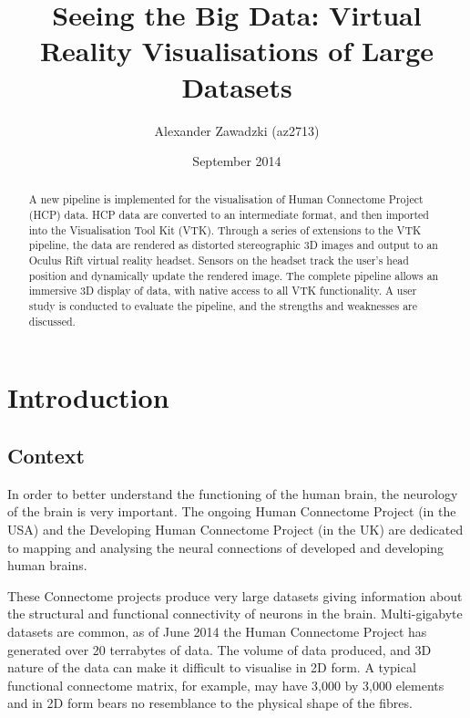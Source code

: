 \documentclass[MSc,paper=a4,pagesize=auto]{icldt}
\title{Seeing the Big Data: Virtual Reality Visualisations of Large Datasets}
\author{Alexander Zawadzki (az2713)}
\date{September 2014}
\begin{document}
\maketitle

\begin{abstract}
A new pipeline is implemented for the visualisation of Human Connectome Project (HCP) data. HCP data are converted to an intermediate format, and then imported into the Visualisation Tool Kit (VTK). Through a series of extensions to the VTK pipeline, the data are rendered as distorted stereographic 3D images and output to an Oculus Rift virtual reality headset. Sensors on the headset track the user's head position and dynamically update the rendered image. The complete pipeline allows an immersive 3D display of data, with native access to all VTK functionality. A user study is conducted to evaluate the pipeline, and the strengths and weaknesses are discussed.


\end{abstract}

\makededication
\tableofcontents

\listoftables
\listoffigures


\chapter{Introduction}
\section{Context}
In order to better understand the functioning of the human brain, the neurology of the brain is very important. The ongoing Human Connectome Project (in the USA) and the Developing Human Connectome Project (in the UK) are dedicated to mapping and analysing the neural connections of developed and developing human brains. 

These Connectome projects produce very large datasets giving information about the structural and functional connectivity of neurons in the brain. Multi-gigabyte datasets are common, as of June 2014 the Human Connectome Project has generated over 20 terrabytes of data. The volume of data produced, and 3D nature of the data can make it difficult to visualise in 2D form. A typical functional connectome matrix, for example, may have 3,000 by 3,000 elements and in 2D form bears no resemblance to the physical shape of the fibres.
\end{document}
